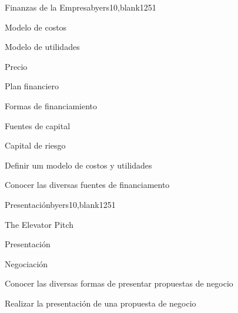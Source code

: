 \begin{syllabus}
\begin{unit}{Finanzas de la Empresa}{byers10,blank12}{5}{1}
	\begin{topics}
      \item Modelo de costos
      \item Modelo de utilidades
      \item Precio
      \item Plan financiero
      \item Formas de financiamiento
      \item Fuentes de capital
      \item Capital de riesgo
   \end{topics}

   \begin{unitgoals}
      \item Definir um modelo de costos y utilidades
      \item Conocer las diversas fuentes de financiamento
   \end{unitgoals}
\end{unit}

\begin{unit}{Presentación}{byers10,blank12}{5}{1}
	\begin{topics}
      \item The Elevator Pitch
      \item Presentación
      \item Negociación
    \end{topics}

   \begin{unitgoals}
      \item Conocer las diversas formas de presentar propuestas de negocio
      \item Realizar la presentación de una propuesta de negocio
   \end{unitgoals}
\end{unit}



\begin{coursebibliography}
\end{coursebibliography}

\end{syllabus}
